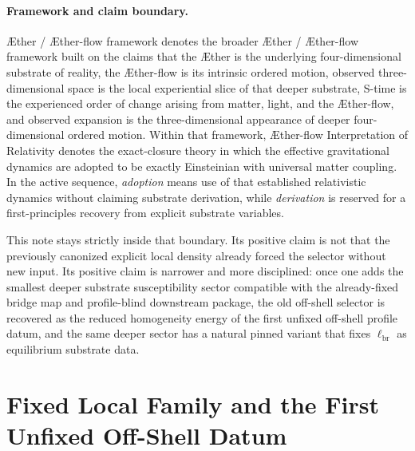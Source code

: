 \documentclass[11pt]{article}
\newcommand{\Aether}{\AE{}ther}
\newcommand{\Aflow}{\AE{}ther-flow}
\newcommand{\TheoryName}{\Aflow{} Interpretation of Relativity}
\newcommand{\TheoryProgram}{\Aether{} / \Aflow{} framework}
\newcommand{\CurvScale}{\ell_{\mathrm{br}}}
\begin{document}
\paragraph{Framework and claim boundary.}
\TheoryProgram{} denotes the broader \Aether{} / \Aflow{} framework built on the claims that the \Aether{} is the underlying four-dimensional substrate of reality, the \Aflow{} is its intrinsic ordered motion, observed three-dimensional space is the local experiential slice of that deeper substrate, S-time is the experienced order of change arising from matter, light, and the \Aflow{}, and observed expansion is the three-dimensional appearance of deeper four-dimensional ordered motion. Within that framework, \TheoryName{} denotes the exact-closure theory in which the effective gravitational dynamics are adopted to be exactly Einsteinian with universal matter coupling. In the active sequence, \emph{adoption} means use of that established relativistic dynamics without claiming substrate derivation, while \emph{derivation} is reserved for a first-principles recovery from explicit substrate variables.

This note stays strictly inside that boundary. Its positive claim is not that the previously canonized explicit local density already forced the selector without new input. Its positive claim is narrower and more disciplined: once one adds the smallest deeper substrate susceptibility sector compatible with the already-fixed bridge map and profile-blind downstream package, the old off-shell selector is recovered as the reduced homogeneity energy of the first unfixed off-shell profile datum, and the same deeper sector has a natural pinned variant that fixes \(\CurvScale\) as equilibrium substrate data.

\section{Fixed Local Family and the First Unfixed Off-Shell Datum}
\end{document}
